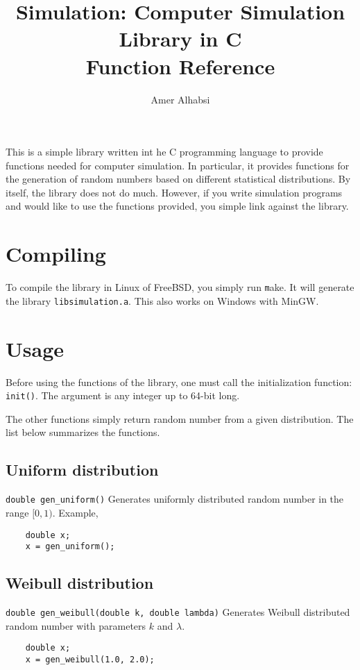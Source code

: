 \documentclass{article}
\title{Simulation: Computer Simulation Library in C\\Function Reference}
\author{Amer Alhabsi}
\begin{document}
\maketitle
This is a simple library written int he C programming language to provide functions needed for computer simulation. In particular, it provides functions for the generation of random numbers based on different statistical distributions. By itself, the library does not do much. However, if you write simulation programs and would like to use the functions provided, you simple link against the library.
\section{Compiling}
To compile the library in Linux of FreeBSD, you simply run {\texttt make}. It will generate the library \texttt{libsimulation.a}. This also works on Windows with MinGW.
\section{Usage}
Before using the functions of the library, one must call the initialization function: \texttt{init()}. The argument is any integer up to 64-bit long.

The other functions simply return random number from a given distribution. The list below summarizes the functions.

\subsection{Uniform distribution}
    \texttt{double gen\_uniform()}  Generates uniformly distributed random number in the range $[0, 1)$. Example,
\begin{verbatim}
    double x;
    x = gen_uniform();
\end{verbatim}
\subsection{Weibull distribution}    
\texttt{double gen\_weibull(double k, double lambda)}  Generates Weibull distributed random number with parameters $k$ and $\lambda$.
\begin{verbatim}
    double x;
    x = gen_weibull(1.0, 2.0);
\end{verbatim}


    
\end{document}
